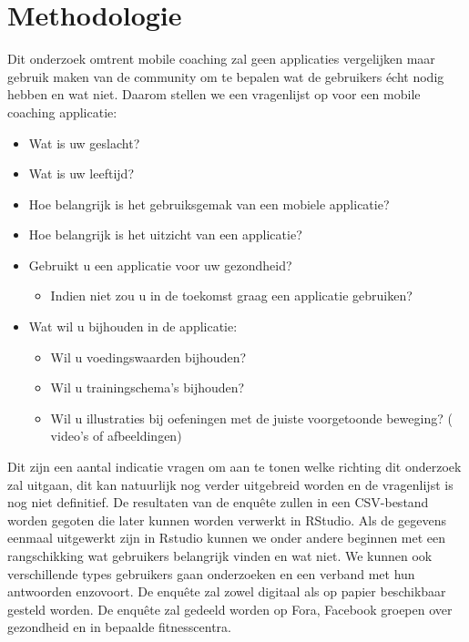 


\section{Methodologie}
\label{sec:methodologie}
Dit onderzoek omtrent mobile coaching zal geen applicaties vergelijken maar gebruik maken van de community om te bepalen wat de gebruikers écht nodig hebben en wat niet. Daarom stellen we een vragenlijst op voor een mobile coaching applicatie: 
\begin{itemize}
\item Wat is uw geslacht?
\item Wat is uw leeftijd?
\item Hoe belangrijk is het gebruiksgemak van een mobiele applicatie?
\item Hoe belangrijk is het uitzicht van een applicatie?
\item Gebruikt u een applicatie voor uw gezondheid?
\begin{itemize}
\item Indien niet zou u in de toekomst graag een applicatie gebruiken?
\end{itemize}
\item Wat wil u bijhouden in de applicatie:
\begin{itemize}
\item Wil u voedingswaarden bijhouden?
\item Wil u trainingschema's bijhouden?
\item Wil u illustraties bij oefeningen met de juiste voorgetoonde beweging? ( video's of afbeeldingen) 
\end{itemize}
\end{itemize}
Dit zijn een aantal indicatie vragen om aan te tonen welke richting dit onderzoek zal uitgaan, dit kan natuurlijk nog verder uitgebreid worden en de vragenlijst is nog niet definitief. De resultaten van de enquête zullen in een CSV-bestand worden gegoten die later kunnen worden verwerkt in RStudio.
 Als de gegevens eenmaal uitgewerkt zijn in Rstudio kunnen we onder andere  beginnen met een rangschikking wat gebruikers belangrijk vinden en wat niet. We kunnen ook verschillende types gebruikers gaan onderzoeken en een verband met hun antwoorden enzovoort.\hfill \break \break
 De enquête zal zowel digitaal als op papier beschikbaar gesteld worden. De enquête zal gedeeld worden op Fora, Facebook groepen over gezondheid en in bepaalde fitnesscentra.

